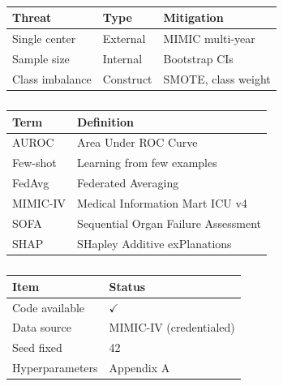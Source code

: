 \begin{table}[h]
\begin{englishblock}
\centering
\caption{}
\begin{tabular}{lll}
\toprule
Threat & Type & Mitigation \\
\midrule
Single center & External & MIMIC multi-year \\
Sample size & Internal & Bootstrap CIs \\
Class imbalance & Construct & SMOTE, class weight \\
\bottomrule
\end{tabular}
\label{tab:threats}
\end{englishblock}
\end{table}

\begin{table}[h]
\begin{englishblock}
\centering
\caption{}
\begin{tabular}{ll}
\toprule
Term & Definition \\
\midrule
AUROC & Area Under ROC Curve \\
Few-shot & Learning from few examples \\
FedAvg & Federated Averaging \\
MIMIC-IV & Medical Information Mart ICU v4 \\
SOFA & Sequential Organ Failure Assessment \\
SHAP & SHapley Additive exPlanations \\
\bottomrule
\end{tabular}
\label{tab:glossary}
\end{englishblock}
\end{table}

\begin{table}[h]
\begin{englishblock}
\centering
\caption{}
\begin{tabular}{ll}
\toprule
Item & Status \\
\midrule
Code available & $\checkmark$ \\
Data source & MIMIC-IV (credentialed) \\
Seed fixed & 42 \\
Hyperparameters & Appendix A \\
\bottomrule
\end{tabular}
\label{tab:repro}
\end{englishblock}
\end{table}

